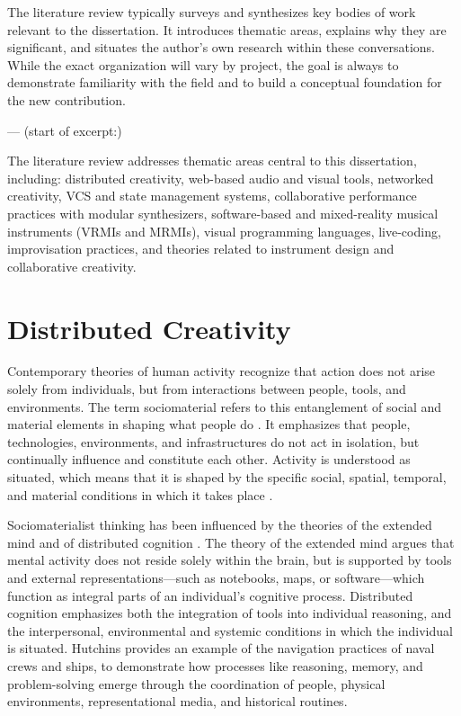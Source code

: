 \documentclass[12pt]{yorkudiss}
\begin{document}
The literature review typically surveys and synthesizes key bodies of work relevant to the dissertation. It introduces thematic areas, explains why they are significant, and situates the author’s own research within these conversations. While the exact organization will vary by project, the goal is always to demonstrate familiarity with the field and to build a conceptual foundation for the new contribution.

--- (start of excerpt:)

The literature review addresses thematic areas central to this dissertation, including: distributed creativity, web-based audio and visual tools, networked creativity, VCS and state management systems, collaborative performance practices with modular synthesizers, software-based and mixed-reality musical instruments (VRMIs and MRMIs), visual programming languages, live-coding, improvisation practices, and theories related to instrument design and collaborative creativity.

\section{Distributed Creativity}
Contemporary theories of human activity recognize that action does not arise solely from individuals, but from interactions between people, tools, and environments. The term sociomaterial refers to this entanglement of social and material elements in shaping what people do \parencite{orlikowski_10_2008}. It emphasizes that people, technologies, environments, and infrastructures do not act in isolation, but continually influence and constitute each other. Activity is understood as situated, which means that it is shaped by the specific social, spatial, temporal, and material conditions in which it takes place \parencite{lave_situated_1991, dourish_where_2004}. 

Sociomaterialist thinking has been influenced by the theories of the extended mind \parencite{clark_extended_1998} and of distributed cognition \parencite{hutchins_cognition_2006}. The theory of the extended mind argues that mental activity does not reside solely within the brain, but is supported by tools and external representations—such as notebooks, maps, or software—which function as integral parts of an individual’s cognitive process. Distributed cognition emphasizes both the integration of tools into individual reasoning, and the interpersonal, environmental and systemic conditions in which the individual is situated. Hutchins provides an example of the navigation practices of naval crews and ships, to demonstrate how processes like reasoning, memory, and problem-solving emerge through the coordination of people, physical environments, representational media, and historical routines.
\end{document}
